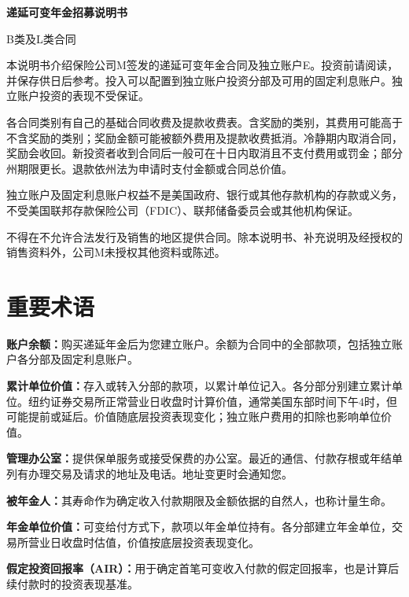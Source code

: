 \documentclass[UTF8,fontset=none,11pt,a4paper]{ctexart}
\begin{document}
{\noindent\fontsize{20}{25}\selectfont\bfseries 递延可变年金招募说明书\par}
\vspace{10pt}
B类及L类合同


本说明书介绍保险公司M签发的递延可变年金合同及独立账户E。投资前请阅读，并保存供日后参考。投入可以配置到独立账户投资分部及可用的固定利息账户。独立账户投资的表现\allowbreak\mbox{不受保证。}


各合同类别有自己的基础合同收费及提款收费表。含奖励的类别，其费用可能高于不含奖励的类别；奖励金额可能被额外费用及提款收费抵消。冷静期内取消合同，奖励会收回。新投资者收到合同后一般可在十日内取消且不支付费用或罚金；部分州期限更长。退款依州法为申请时支付金额或合\allowbreak\mbox{同总价值。}


独立账户及固定利息账户权益不是美国政府、银行或其他存款机构的存款或义务，不受美国联邦存款保险公司（FDIC）、联邦储备委员会或其他机\allowbreak\mbox{构保证。}


不得在不允许合法发行及销售的地区提供合同。除本说明书、补充说明及经授权的销售资料外，公司M未授权其他资\allowbreak\mbox{料或陈述。}


\section*{重要术语}
\textbf{账户余额：}购买递延年金后为您建立账户。余额为合同中的全部款项，包括独立账户各分部及固定\allowbreak\mbox{利息账户。}


\textbf{累计单位价值：}存入或转入分部的款项，以累计单位记入。各分部分别建立累计单位。纽约证券交易所正常营业日收盘时计算价值，通常美国东部时间下午4时，但可能提前或延后。价值随底层投资表现变化；独立账户费用的扣除也影响\allowbreak\mbox{单位价值。}


\textbf{管理办公室：}提供保单服务或接受保费的办公室。最近的通信、付款存根或年结单列有办理交易及请求的地址及电话。地址变更时\allowbreak\mbox{会通知您。}


\textbf{被年金人：}其寿命作为确定收入付款期限及金额依据的自然人，也称\allowbreak\mbox{计量生命。}


\textbf{年金单位价值：}可变给付方式下，款项以年金单位持有。各分部建立年金单位，交易所营业日收盘时估值，价值按底层投资\allowbreak\mbox{表现变化。}


\textbf{假定投资回报率（AIR）：}用于确定首笔可变收入付款的假定回报率，也是计算后续付款时的投资表\allowbreak\mbox{现基准。}
\end{document}
